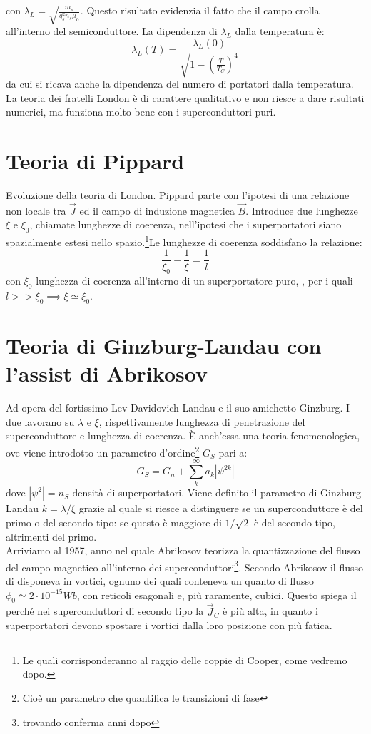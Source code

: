 \documentclass{book}
\begin{document}
        con $\displaystyle \lambda_{L} = \sqrt{\frac{m_{s}}{q_{s}^{2}n_{s}\mu_{0}}}$. Questo risultato evidenzia il fatto che il campo crolla all'interno del semiconduttore. La dipendenza di $\lambda_{L}$ dalla temperatura è:
        \begin{equation}
            \lambda_{L}(T) = \frac{\lambda_{L}(0)}{\sqrt{1-(\frac{T}{T_{C}})^{4}}}
        \end{equation}
        da cui si ricava anche la dipendenza del numero di portatori dalla temperatura. La teoria dei fratelli London è di carattere qualitativo e non riesce a dare risultati numerici, ma funziona molto bene con i superconduttori puri.

\section{Teoria di Pippard}
    Evoluzione della teoria di London. Pippard parte con l'ipotesi di una relazione non locale tra $\vec{J}$ ed il campo di induzione magnetica $\vec{B}$. Introduce due lunghezze $\xi$ e $\xi_{0}$, chiamate lunghezze di coerenza, nell'ipotesi che i superportatori siano spazialmente estesi nello spazio.\footnote{Le quali corrisponderanno al raggio delle coppie di Cooper, come vedremo dopo.}Le lunghezze di coerenza soddisfano la relazione:
    \begin{equation}
        \frac{1}{\xi_{0}}-\frac{1}{\xi} = \frac{1}{l} 
    \end{equation}
    con $\xi_{0}$ lunghezza di coerenza all'interno di un superportatore puro, , per i quali  $l>> \xi_{0} \implies \xi \simeq \xi_{0}$.
\section{Teoria di Ginzburg-Landau con l'assist di Abrikosov}
    Ad opera del fortissimo Lev Davidovich Landau e il suo amichetto Ginzburg. I due lavorano su $\lambda$ e $\xi$, rispettivamente lunghezza di penetrazione del superconduttore e lunghezza di coerenza. È anch'essa una teoria fenomenologica, ove viene introdotto un parametro d'ordine\footnote{Cioè un parametro che quantifica le transizioni di fase} $G_{S}$ pari a:
    \begin{equation}
        G_{S}=G_{n}+\sum_{k} ^{\infty} a_{k}|\psi^{2k}|
    \end{equation}
    dove $|\psi^{2}|=n_{S}$ densità di superportatori. Viene definito il parametro di Ginzburg-Landau $k = \lambda/\xi$ grazie al quale si riesce a distinguere se un superconduttore è del primo o del secondo tipo: se questo è maggiore di $1/\sqrt{2}$ è del secondo tipo, altrimenti del primo. \\
    Arriviamo al 1957, anno nel quale Abrikosov teorizza la quantizzazione del flusso del campo magnetico all'interno dei superconduttori\footnote{trovando conferma anni dopo}. Secondo Abrikosov il flusso di disponeva in vortici, ognuno dei quali conteneva un quanto di flusso $\phi_{0} \simeq 2 \cdot 10^{-15}Wb$, con reticoli esagonali e, più raramente, cubici. Questo spiega il perché nei superconduttori di secondo tipo la $\vec{J}_{C}$ è più alta, in quanto i superportatori devono spostare i vortici dalla loro posizione con più fatica.
\end{document}
